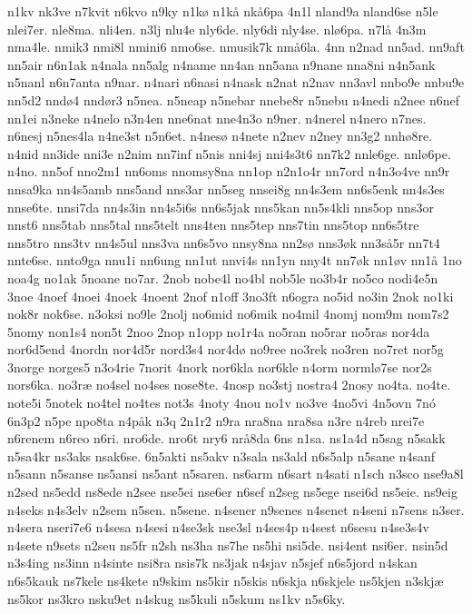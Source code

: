 {n1kv
nk3ve
n7kvit
n6kvo
n9ky
n1k^^f8
n1k^^e5
nk^^e56pa
4n1l
nland9a
nland6se
n5le
nlei7er.
nle8ma.
nli4en.
n3lj
nlu4e
nly6de.
nly6di
nly4se.
nl^^f86pa.
n7l^^e5
4n3m
nma4le.
nmik3
nmi8l
nmini6
nmo6se.
nmusik7k
nm^^e56la.
4nn
n2nad
nn5ad.
nn9aft
nn5air
n6n1ak
n4nala
nn5alg
n4name
nn4an
nn5ana
n9nane
nna8ni
n4n5ank
n5nanl
n6n7anta
n9nar.
n4nari
n6nasi
n4nask
n2nat
n2nav
nn3avl
nnbo9e
nnbu9e
nn5d2
nnd^^f84
nnd^^f8r3
n5nea.
n5neap
n5nebar
nnebe8r
n5nebu
n4nedi
n2nee
n6nef
nn1ei
n3neke
n4nelo
n3n4en
nne6nat
nne4n3o
n9ner.
n4nerel
n4nero
n7nes.
n6nesj
n5nes4la
n4ne3st
n5n6et.
n4nes^^f8
n4nete
n2nev
n2ney
nn3g2
nnh^^f88re.
n4nid
nn3ide
nni3e
n2nim
nn7inf
n5nis
nni4sj
nni4s3t6
nn7k2
nnle6ge.
nnl^^f86pe.
n4no.
nn5of
nno2m1
nn6oms
nnomsy8na
nn1op
n2n1o4r
nn7ord
n4n3o4ve
nn9r
nnsa9ka
nn4s5amb
nns5and
nns3ar
nn5seg
nnsei8g
nn4s3em
nn6s5enk
nn4s3es
nnse6te.
nnsi7da
nn4s3in
nn4s5i6s
nn6s5jak
nns5kan
nn5s4kli
nns5op
nns3or
nnst6
nns5tab
nns5tal
nns5telt
nns4ten
nns5tep
nns7tin
nns5top
nn6s5tre
nns5tro
nns3tv
nn4s5ul
nns3va
nn6s5vo
nnsy8na
nn2s^^f8
nns3^^f8k
nn3s^^e55r
nn7t4
nnte6se.
nnto9ga
nnu1i
nn6ung
nn1ut
nnvi4s
nn1yn
nny4t
nn7^^f8k
nn1^^f8v
nn1^^e5
1no
noa4g
no1ak
5noane
no7ar.
2nob
nobe4l
no4bl
nob5le
no3b4r
no5co
nodi4e5n
3noe
4noef
4noei
4noek
4noent
2nof
n1off
3no3ft
n6ogra
no5id
no3in
2nok
no1ki
nok8r
nok6se.
n3oksi
no9le
2nolj
no6mid
no6mik
no4mil
4nomj
nom9m
nom7s2
5nomy
non1s4
non5t
2noo
2nop
n1opp
no1r4a
no5ran
no5rar
no5ras
nor4da
nor6d5end
4nordn
nor4d5r
nord3s4
nor4d^^f8
no9ree
no3rek
no3ren
no7ret
nor5g
3norge
norges5
n3o4rie
7norit
4nork
nor6kla
nor6kle
n4orm
norml^^f87se
nor2s
nors6ka.
no3r^^e6
no4sel
no4ses
nose8te.
4nosp
no3stj
nostra4
2nosy
no4ta.
no4te.
note5i
5notek
no4tel
no4tes
not3s
4noty
4nou
no1v
no3ve
4no5vi
4n5ovn
7n^^f3
6n3p2
n5pe
npo8ta
n4p^^e5k
n3q
2n1r2
n9ra
nra8na
nra8sa
n3re
n4reb
nrei7e
n6renem
n6reo
n6ri.
nro6de.
nro6t
nry6
nr^^e58da
6ns
n1sa.
ns1a4d
n5sag
n5sakk
n5sa4kr
ns3aks
nsak6se.
6n5akti
ns5akv
n3sala
ns3ald
n6s5alp
n5sane
n4sanf
n5sann
n5sanse
ns5ansi
ns5ant
n5saren.
ns6arm
n6sart
n4sati
n1sch
n3sco
nse9a8l
n2sed
ns5edd
ns8ede
n2see
nse5ei
nse6er
n6sef
n2seg
ns5ege
nsei6d
ns5eie.
ns9eig
n4seks
n4s3elv
n2sem
n5sen.
n5sene.
n4sener
n9senes
n4senet
n4seni
n7sens
n3ser.
n4sera
nseri7e6
n4sesa
n4sesi
n4se3sk
nse3sl
n4ses4p
n4sest
n6sesu
n4se3s4v
n4sete
n9sets
n2seu
ns5fr
n2sh
ns3ha
ns7he
ns5hi
nsi5de.
nsi4ent
nsi6er.
nsin5d
n3s4ing
ns3inn
n4sinte
nsi8ra
nsis7k
ns3jak
n4sjav
n5sjef
n6s5jord
n4skan
n6s5kauk
ns7kele
ns4kete
n9skim
ns5kir
n5skis
n6skja
n6skjele
ns5kjen
n3skj^^e6
ns5kor
ns3kro
nsku9et
n4skug
ns5kuli
n5skum
ns1kv
n5s6ky.
}
